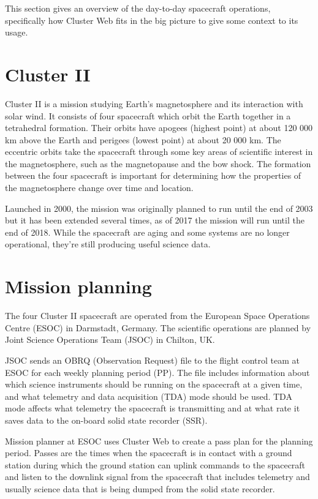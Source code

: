 
This section gives an overview of the day-to-day spacecraft operations, specifically how Cluster Web fits in the big picture to give some context to its usage.

\section{Cluster II}
Cluster II is a mission studying Earth's magnetosphere and its interaction with solar wind. It consists of four spacecraft which orbit the Earth together in a tetrahedral formation. Their orbits have apogees (highest point) at about 120 000 km above the Earth and perigees (lowest point) at about 20 000 km. The eccentric orbits take the spacecraft through some key areas of scientific interest in the magnetosphere, such as the magnetopause and the bow shock. The formation between the four spacecraft is important for determining how the properties of the magnetosphere change over time and location.

Launched in 2000, the mission was originally planned to run until the end of 2003 but it has been extended several times, as of 2017 the mission will run until the end of 2018. While the spacecraft are aging and some systems are no longer operational, they're still producing useful science data.

\section{Mission planning}
The four Cluster II spacecraft are operated from the European Space Operations Centre (ESOC) in Darmstadt, Germany. The scientific operations are planned by Joint Science Operations Team (JSOC) in Chilton, UK.

JSOC sends an OBRQ (Observation Request) file to the flight control team at ESOC for each weekly planning period (PP). The file includes information about which science instruments should be running on the spacecraft at a given time, and what telemetry and data acquisition (TDA) mode should be used. TDA mode affects what telemetry the spacecraft is transmitting and at what rate it saves data to the on-board solid state recorder (SSR).

Mission planner at ESOC uses Cluster Web to create a pass plan for the planning period. Passes are the times when the spacecraft is in contact with a ground station during which the ground station can uplink commands to the spacecraft and listen to the downlink signal from the spacecraft that includes telemetry and usually science data that is being dumped from the solid state recorder.

